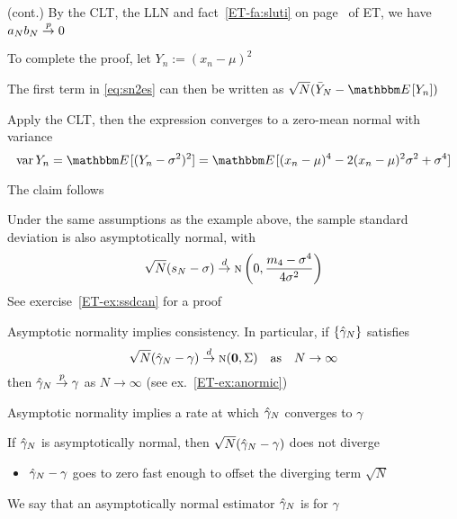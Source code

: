 \begin{frame}

    \vspace{2em}
    \Eg (cont.) By the CLT, the LLN and fact~\ref{ET-fa:sluti}
    on page~\pageref{ET-fa:sluti} of ET, we
    have $a_N b_N \stackrel { p } {\to} 0$

    \vspace{.7em}
    To complete the proof, let $Y_n := (x_n - \mu)^2$
    
    The first term in \eqref{eq:sn2es} can then be written as
    $\sqrt{N}(\bar Y_N - \EE [Y_n])$
    
    Apply the CLT, then the expression converges to
    a zero-mean normal with variance 
    \begin{equation*}
        \var Y_n
        = \EE[ (Y_n - \sigma^2)^2 ]
        = \EE[ (x_n - \mu)^4 - 2(x_n - \mu)^2 \sigma^2 + \sigma^4 ]
    \end{equation*}
    
    The claim follows
    
\end{frame}

\begin{frame}
    
    \vspace{2em}
    \Eg Under the same assumptions as the example above, the sample standard
    deviation is also asymptotically normal, with 
    \begin{equation}
        \label{eq:avarsn}
        \sqrt{N}(s_N - \sigma)
        \stackrel { d } {\to} \textrm{\sc n}\left(0, \frac{m_4 - \sigma^4}{4 \sigma^2} \right)
    \end{equation}
    See exercise~\ref{ET-ex:ssdcan} for a proof
    
    \vspace{.7em}
    \Eg
    Asymptotic normality implies consistency.  In particular, if
    $\{\hat \gamma_N\}$ satisfies 
    $$ \sqrt{N} (\hat \gamma_N - \gamma) \stackrel { d } {\to} \textrm{\sc n}({\mathbf 0}, \Sigma)  
        \quad \text{as} \quad
        N \to \infty$$
    then $\hat \gamma_N \stackrel { p } {\to} \gamma$
    as $N \to \infty$ (see ex.~\ref{ET-ex:anormic})

\end{frame}

\begin{frame}

    \vspace{2em}
    Asymptotic normality implies a rate at which 
    $\hat \gamma_N$ converges to $\gamma$
    
    \vspace{.7em}
    If $\hat \gamma_N$ is asymptotically
    normal, then $\sqrt{N} ( \hat \gamma_N - \gamma)$ does not diverge
    \begin{itemize}
    \item $\hat \gamma_N - \gamma$ goes to zero
    fast enough to offset the diverging term $\sqrt{N}$
    \end{itemize}
    
    \vspace{.7em}
    We say that an asymptotically normal estimator $\hat \gamma_N$
    is  for $\gamma$
    
\end{frame}

